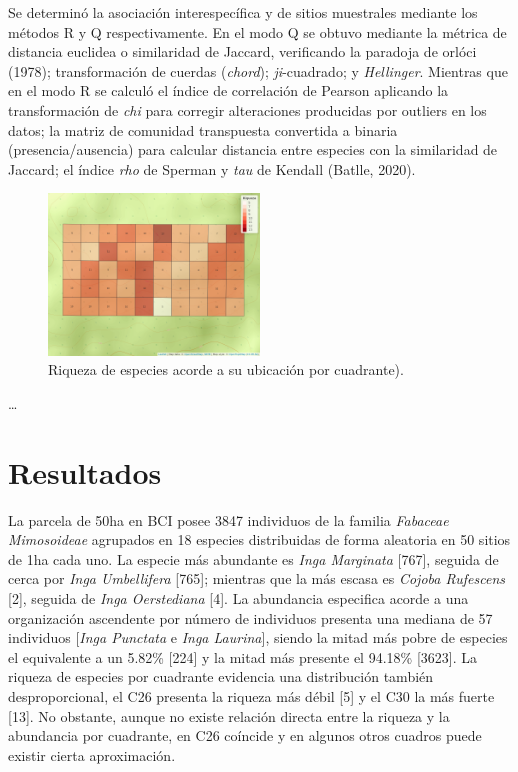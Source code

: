 \documentclass[11pt,]{article}
\begin{document}
Se determinó la asociación interespecífica y de sitios muestrales
mediante los métodos R y Q respectivamente. En el modo Q se obtuvo
mediante la métrica de distancia euclidea o similaridad de Jaccard,
verificando la paradoja de orlóci (1978); transformación de cuerdas
(\emph{chord}); \emph{ji}-cuadrado; y \emph{Hellinger}. Mientras que en
el modo R se calculó el índice de correlación de Pearson aplicando la
transformación de \emph{chi} para corregir alteraciones producidas por
outliers en los datos; la matriz de comunidad transpuesta convertida a
binaria (presencia/ausencia) para calcular distancia entre especies con
la similaridad de Jaccard; el índice \emph{rho} de Sperman y \emph{tau}
de Kendall (Batlle, 2020).

\begin{figure}
\centering
\includegraphics[width=0.50000\textwidth]{mapa_cuadros_riq_mi_familia.png}
\caption{Riqueza de especies acorde a su ubicación por cuadrante).}
\end{figure}

\ldots

\section{Resultados}\label{resultados}

La parcela de 50ha en BCI posee 3847 individuos de la familia
\emph{Fabaceae Mimosoideae} agrupados en 18 especies distribuidas de
forma aleatoria en 50 sitios de 1ha cada uno. La especie más abundante
es \emph{Inga Marginata} {[}767{]}, seguida de cerca por \emph{Inga
Umbellifera} {[}765{]}; mientras que la más escasa es \emph{Cojoba
Rufescens} {[}2{]}, seguida de \emph{Inga Oerstediana} {[}4{]}. La
abundancia especifica acorde a una organización ascendente por número de
individuos presenta una mediana de 57 individuos {[}\emph{Inga Punctata}
e \emph{Inga Laurina}{]}, siendo la mitad más pobre de especies el
equivalente a un 5.82\% {[}224{]} y la mitad más presente el 94.18\%
{[}3623{]}. La riqueza de especies por cuadrante evidencia una
distribución también desproporcional, el C26 presenta la riqueza más
débil {[}5{]} y el C30 la más fuerte {[}13{]}. No obstante, aunque no
existe relación directa entre la riqueza y la abundancia por cuadrante,
en C26 coíncide y en algunos otros cuadros puede existir cierta
aproximación.
\end{document}
